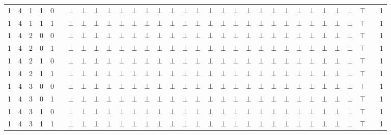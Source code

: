 \documentclass[12pt]{extarticle}
\begin{document}
\begin{landscape}
\begin{tiny}
\begin{longtable}[c]{llllllllllllllllllllllllllllllll}
1 & 4 & 1 & 1 & 0 &  & $\bot$ & $\bot$ & $\bot$ & $\bot$ & $\bot$ & $\bot$ & $\bot$ & $\bot$ & $\bot$ & $\bot$ & $\bot$ & $\bot$ & $\bot$ & $\bot$ & $\bot$ & $\bot$ & $\bot$ & $\bot$ & $\bot$ & $\bot$ & $\bot$ & $\bot$ & $\bot$ & $\top$ &  & 1 \\
1 & 4 & 1 & 1 & 1 &  & $\bot$ & $\bot$ & $\bot$ & $\bot$ & $\bot$ & $\bot$ & $\bot$ & $\bot$ & $\bot$ & $\bot$ & $\bot$ & $\bot$ & $\bot$ & $\bot$ & $\bot$ & $\bot$ & $\bot$ & $\bot$ & $\bot$ & $\bot$ & $\bot$ & $\bot$ & $\bot$ & $\top$ &  & 1 \\
1 & 4 & 2 & 0 & 0 &  & $\bot$ & $\bot$ & $\bot$ & $\bot$ & $\bot$ & $\bot$ & $\bot$ & $\bot$ & $\bot$ & $\bot$ & $\bot$ & $\bot$ & $\bot$ & $\bot$ & $\bot$ & $\bot$ & $\bot$ & $\bot$ & $\bot$ & $\bot$ & $\bot$ & $\bot$ & $\bot$ & $\top$ &  & 1 \\
1 & 4 & 2 & 0 & 1 &  & $\bot$ & $\bot$ & $\bot$ & $\bot$ & $\bot$ & $\bot$ & $\bot$ & $\bot$ & $\bot$ & $\bot$ & $\bot$ & $\bot$ & $\bot$ & $\bot$ & $\bot$ & $\bot$ & $\bot$ & $\bot$ & $\bot$ & $\bot$ & $\bot$ & $\bot$ & $\bot$ & $\top$ &  & 1 \\
1 & 4 & 2 & 1 & 0 &  & $\bot$ & $\bot$ & $\bot$ & $\bot$ & $\bot$ & $\bot$ & $\bot$ & $\bot$ & $\bot$ & $\bot$ & $\bot$ & $\bot$ & $\bot$ & $\bot$ & $\bot$ & $\bot$ & $\bot$ & $\bot$ & $\bot$ & $\bot$ & $\bot$ & $\bot$ & $\bot$ & $\top$ &  & 1 \\
1 & 4 & 2 & 1 & 1 &  & $\bot$ & $\bot$ & $\bot$ & $\bot$ & $\bot$ & $\bot$ & $\bot$ & $\bot$ & $\bot$ & $\bot$ & $\bot$ & $\bot$ & $\bot$ & $\bot$ & $\bot$ & $\bot$ & $\bot$ & $\bot$ & $\bot$ & $\bot$ & $\bot$ & $\bot$ & $\bot$ & $\top$ &  & 1 \\
1 & 4 & 3 & 0 & 0 &  & $\bot$ & $\bot$ & $\bot$ & $\bot$ & $\bot$ & $\bot$ & $\bot$ & $\bot$ & $\bot$ & $\bot$ & $\bot$ & $\bot$ & $\bot$ & $\bot$ & $\bot$ & $\bot$ & $\bot$ & $\bot$ & $\bot$ & $\bot$ & $\bot$ & $\bot$ & $\bot$ & $\top$ &  & 1 \\
1 & 4 & 3 & 0 & 1 &  & $\bot$ & $\bot$ & $\bot$ & $\bot$ & $\bot$ & $\bot$ & $\bot$ & $\bot$ & $\bot$ & $\bot$ & $\bot$ & $\bot$ & $\bot$ & $\bot$ & $\bot$ & $\bot$ & $\bot$ & $\bot$ & $\bot$ & $\bot$ & $\bot$ & $\bot$ & $\bot$ & $\top$ &  & 1 \\
1 & 4 & 3 & 1 & 0 &  & $\bot$ & $\bot$ & $\bot$ & $\bot$ & $\bot$ & $\bot$ & $\bot$ & $\bot$ & $\bot$ & $\bot$ & $\bot$ & $\bot$ & $\bot$ & $\bot$ & $\bot$ & $\bot$ & $\bot$ & $\bot$ & $\bot$ & $\bot$ & $\bot$ & $\bot$ & $\bot$ & $\top$ &  & 1 \\
1 & 4 & 3 & 1 & 1 &  & $\bot$ & $\bot$ & $\bot$ & $\bot$ & $\bot$ & $\bot$ & $\bot$ & $\bot$ & $\bot$ & $\bot$ & $\bot$ & $\bot$ & $\bot$ & $\bot$ & $\bot$ & $\bot$ & $\bot$ & $\bot$ & $\bot$ & $\bot$ & $\bot$ & $\bot$ & $\bot$ & $\top$ &  & 1 \\

\end{longtable}
\end{tiny}
\end{landscape}
\end{document}
